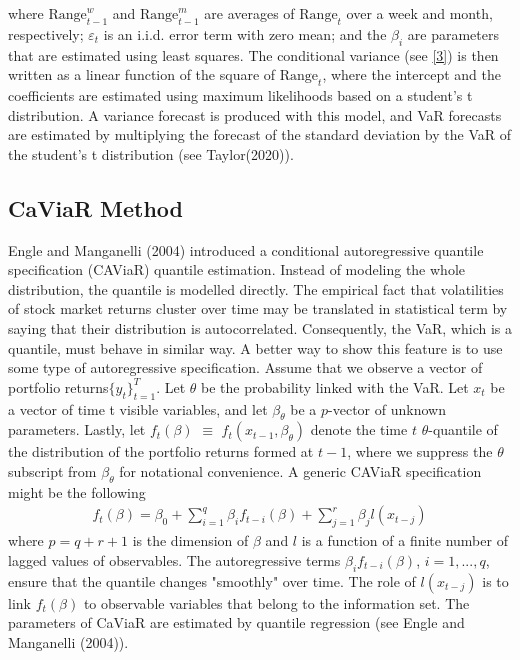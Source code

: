 \documentclass[a4paper,11pt,oneside]{book}
\begin{document}
where  $\text{Range}^{w}_{t-1}$
and $\text{Range}^{m}_{t-1}$ are
averages of $\text{Range}_{t}$ over a week and month, respectively;
$\varepsilon_t$
is an i.i.d. error term with zero mean; and the $\beta_{i}$
are parameters that are estimated using least squares.
The conditional variance (see \autoref{3})  is then written as a linear
function of the square of $\text{Range}_{t}$, where the intercept and
the coefficients are estimated using maximum likelihoods
based on a student's t distribution. A variance forecast is produced with this model, and VaR forecasts are estimated by multiplying the forecast of the standard deviation by the VaR of the student's t distribution (see Taylor(2020)).


\subsection{CaViaR Method}
Engle and Manganelli (2004) introduced a conditional autoregressive quantile specification (CAViaR) quantile estimation. Instead of modeling the whole distribution, the quantile is modelled directly. The empirical fact that volatilities of stock market returns cluster over time may be translated in statistical term by saying that their distribution is autocorrelated. Consequently, the VaR, which is a quantile, must behave in similar way. A better way to show this feature is to use some type of autoregressive specification.
\newline\newline
 Assume that we observe a vector of portfolio returns$\{y_t\}^T_{t=1}$. Let $\theta$ be the probability linked with the VaR. Let $x_t$ be a vector of time t visible variables, and let  ${\beta}_\theta$ be a $p$-vector of unknown parameters. Lastly, let $f_t(\beta) $ $\equiv$ $ f_t(x_{t-1},{\beta}_\theta)$ denote the time $t$ $\theta$-quantile of the distribution of the portfolio returns formed at $t-1$, where we suppress the $\theta$ subscript from $\beta_\theta$ for notational convenience. A generic CAViaR specification might be the following  
\begin{equation}
\begin{aligned}
f_t(\beta)=\beta_0 + \sum_{i=1}^{q} \beta_{i}f _{t-i}(\beta) +\sum_{j=1}^{r}\beta_{j}l(x_{t-j})
\label{5}
\end{aligned}
\end{equation}
where $p=q+r+1$ is the dimension of $\beta$ and $l$ is a function of a finite number of lagged values of observables. The autoregressive terms $\beta_{i}f_{t-i}(\beta)$, $i = 1,...,q$, ensure that the quantile changes "smoothly" over time. The role of $l(x_{t-j})$ is to link $f_{t}(\beta)$ to observable variables that belong to the information set. The parameters of CaViaR are estimated by quantile regression (see Engle and Manganelli (2004)).
\end{document}
